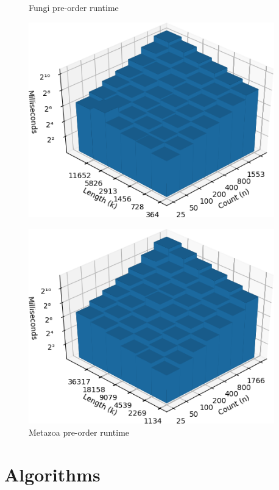 \documentclass{bmcart}
\begin{document}
\begin{backmatter}
\begin{figure}[h]
\begin{minipage}{0.48\textwidth}
			\centering
			\caption{Fungi pre-order runtime}
			\label{Fig:Fungi}
			\includegraphics[width=0.95\textwidth]{fungi-preorder.png}
		\end{minipage}
		\hfill
		\begin{minipage}{0.48\textwidth}
			\centering
			\caption{Metazoa pre-order runtime}
			\label{Fig:Metazoa}
			\includegraphics[width=0.95\textwidth]{metazoa-preorder.png}
		\end{minipage}
		
	\end{figure}

	
	\section*{Algorithms}	
	

\end{backmatter}
\end{document}
